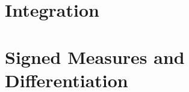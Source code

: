 \documentclass[oneside]{book}
\begin{document}
\setcounter{chapter}{-1}





\chapter{Integration}

\chapter{Signed Measures and Differentiation}


\end{document}

